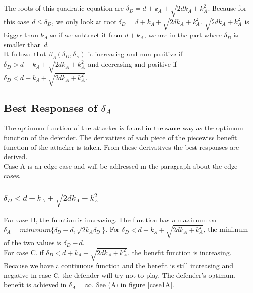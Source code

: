 The roots of this quadratic equation are $\delta_{D}=d+k_{A}\pm \sqrt{2dk_{A}+k_{A}^{2}}$. Because for this case $d\leq \delta_{D}$, we only look at root $\delta_{D}=d+k_{A} + \sqrt{2dk_{A}+k_{A}^{2}}$. $\sqrt{2dk_{A}+k_{A}^{2}}$ is bigger than $k_{A}$ so if we subtract it from $d+k_{A}$, we are in the part where $\delta_{D}$ is smaller than \textit{d}. \\
It follows that $\beta_{A}(\delta_{D},\delta_{A})$ is increasing and non-positive if $\delta_{D}> d+k_{A} + \sqrt{2dk_{A}+k_{A}^{2}}$ and decreasing and positive if $\delta_{D} < d+k_{A} + \sqrt{2dk_{A}+k_{A}^{2}}$. \\

\subsection{Best Responses of $\delta_{A}$}
The optimum function of the attacker is found in the same way as the optimum function of the defender. The derivatives of each piece of the piecewise benefit function of the attacker is taken. From these derivatives the best responses are derived. \\
Case A is an edge case and will be addressed in the paragraph about the edge cases.
%
%

\subsubsection*{$\delta_{D} < d+k_{A} + \sqrt{2dk_{A}+k_{A}^{2}}$} 
For case B, the function is increasing. The function has a maximum on $\delta_{A} = minimum \{\delta_{D} -d, \sqrt{2k_{A}\delta_{D}} \} $. For $\delta_{D} < d+k_{A} + \sqrt{2dk_{A}+k_{A}^{2}}$, the minimum of the two values is $\delta_{D}-d$.\\
For case C, if $\delta_{D} < d+k_{A} + \sqrt{2dk_{A}+k_{A}^{2}}$, the benefit function is increasing. Because we have a continuous function and the benefit is still increasing and negative in case C, the defender will try not to play. The defender's optimum benefit is achieved in $\delta_{A}=\infty$. See (A) in figure \ref{case1A}.

